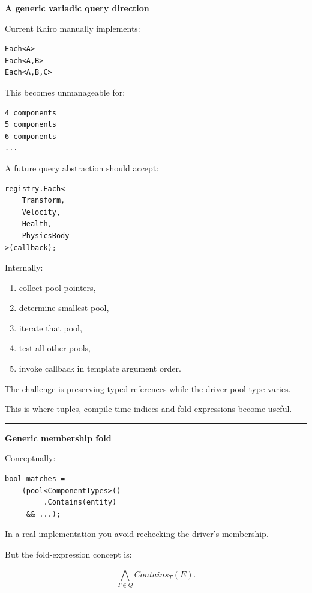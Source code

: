 \textbf{A generic variadic query direction}

Current Kairo manually implements:

\begin{verbatim}
Each<A>
Each<A,B>
Each<A,B,C>
\end{verbatim}

This becomes unmanageable for:

\begin{verbatim}
4 components
5 components
6 components
...
\end{verbatim}

A future query abstraction should accept:

\begin{verbatim}
registry.Each<
    Transform,
    Velocity,
    Health,
    PhysicsBody
>(callback);
\end{verbatim}

Internally:

\begin{enumerate}
\def\labelenumi{\arabic{enumi}.}
\tightlist
\item
  collect pool pointers,
\item
  determine smallest pool,
\item
  iterate that pool,
\item
  test all other pools,
\item
  invoke callback in template argument order.
\end{enumerate}

The challenge is preserving typed references while the driver pool type varies.

This is where tuples, compile-time indices and fold expressions become useful.

\begin{center}\rule{0.5\linewidth}{0.5pt}\end{center}

\textbf{Generic membership fold}

Conceptually:

\begin{verbatim}
bool matches =
    (pool<ComponentTypes>()
         .Contains(entity)
     && ...);
\end{verbatim}

In a real implementation you avoid rechecking the driver's membership.

But the fold-expression concept is:

\[
\bigwedge_{T\in Q}
Contains_T(E).
\]

